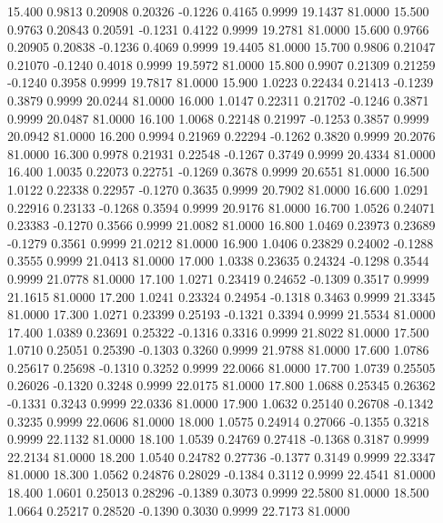   15.400   0.9813   0.20908   0.20326  -0.1226   0.4165   0.9999  19.1437  81.0000
  15.500   0.9763   0.20843   0.20591  -0.1231   0.4122   0.9999  19.2781  81.0000
  15.600   0.9766   0.20905   0.20838  -0.1236   0.4069   0.9999  19.4405  81.0000
  15.700   0.9806   0.21047   0.21070  -0.1240   0.4018   0.9999  19.5972  81.0000
  15.800   0.9907   0.21309   0.21259  -0.1240   0.3958   0.9999  19.7817  81.0000
  15.900   1.0223   0.22434   0.21413  -0.1239   0.3879   0.9999  20.0244  81.0000
  16.000   1.0147   0.22311   0.21702  -0.1246   0.3871   0.9999  20.0487  81.0000
  16.100   1.0068   0.22148   0.21997  -0.1253   0.3857   0.9999  20.0942  81.0000
  16.200   0.9994   0.21969   0.22294  -0.1262   0.3820   0.9999  20.2076  81.0000
  16.300   0.9978   0.21931   0.22548  -0.1267   0.3749   0.9999  20.4334  81.0000
  16.400   1.0035   0.22073   0.22751  -0.1269   0.3678   0.9999  20.6551  81.0000
  16.500   1.0122   0.22338   0.22957  -0.1270   0.3635   0.9999  20.7902  81.0000
  16.600   1.0291   0.22916   0.23133  -0.1268   0.3594   0.9999  20.9176  81.0000
  16.700   1.0526   0.24071   0.23383  -0.1270   0.3566   0.9999  21.0082  81.0000
  16.800   1.0469   0.23973   0.23689  -0.1279   0.3561   0.9999  21.0212  81.0000
  16.900   1.0406   0.23829   0.24002  -0.1288   0.3555   0.9999  21.0413  81.0000
  17.000   1.0338   0.23635   0.24324  -0.1298   0.3544   0.9999  21.0778  81.0000
  17.100   1.0271   0.23419   0.24652  -0.1309   0.3517   0.9999  21.1615  81.0000
  17.200   1.0241   0.23324   0.24954  -0.1318   0.3463   0.9999  21.3345  81.0000
  17.300   1.0271   0.23399   0.25193  -0.1321   0.3394   0.9999  21.5534  81.0000
  17.400   1.0389   0.23691   0.25322  -0.1316   0.3316   0.9999  21.8022  81.0000
  17.500   1.0710   0.25051   0.25390  -0.1303   0.3260   0.9999  21.9788  81.0000
  17.600   1.0786   0.25617   0.25698  -0.1310   0.3252   0.9999  22.0066  81.0000
  17.700   1.0739   0.25505   0.26026  -0.1320   0.3248   0.9999  22.0175  81.0000
  17.800   1.0688   0.25345   0.26362  -0.1331   0.3243   0.9999  22.0336  81.0000
  17.900   1.0632   0.25140   0.26708  -0.1342   0.3235   0.9999  22.0606  81.0000
  18.000   1.0575   0.24914   0.27066  -0.1355   0.3218   0.9999  22.1132  81.0000
  18.100   1.0539   0.24769   0.27418  -0.1368   0.3187   0.9999  22.2134  81.0000
  18.200   1.0540   0.24782   0.27736  -0.1377   0.3149   0.9999  22.3347  81.0000
  18.300   1.0562   0.24876   0.28029  -0.1384   0.3112   0.9999  22.4541  81.0000
  18.400   1.0601   0.25013   0.28296  -0.1389   0.3073   0.9999  22.5800  81.0000
  18.500   1.0664   0.25217   0.28520  -0.1390   0.3030   0.9999  22.7173  81.0000
